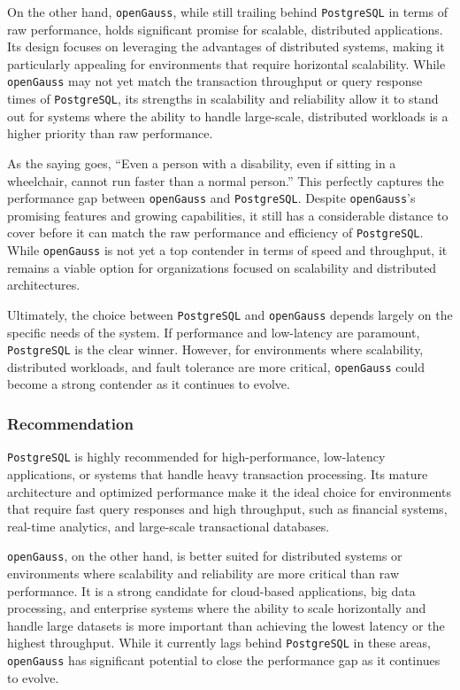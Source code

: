 \documentclass[12pt,a4paper,cs4size]{ctexart}
\begin{document}
On the other hand, \texttt{openGauss}, while still trailing behind \texttt{PostgreSQL} in terms of raw performance, holds significant promise for scalable, distributed applications. Its design focuses on leveraging the advantages of distributed systems, making it particularly appealing for environments that require horizontal scalability. While \texttt{openGauss} may not yet match the transaction throughput or query response times of \texttt{PostgreSQL}, its strengths in scalability and reliability allow it to stand out for systems where the ability to handle large-scale, distributed workloads is a higher priority than raw performance.

As the saying goes, ``Even a person with a disability, even if sitting in a wheelchair, cannot run faster than a normal person.'' \cite{xiong2024} This perfectly captures the performance gap between \texttt{openGauss} and \texttt{PostgreSQL}. Despite \texttt{openGauss}'s promising features and growing capabilities, it still has a considerable distance to cover before it can match the raw performance and efficiency of \texttt{PostgreSQL}. While \texttt{openGauss} is not yet a top contender in terms of speed and throughput, it remains a viable option for organizations focused on scalability and distributed architectures. 

Ultimately, the choice between \texttt{PostgreSQL} and \texttt{openGauss} depends largely on the specific needs of the system. If performance and low-latency are paramount, \texttt{PostgreSQL} is the clear winner. However, for environments where scalability, distributed workloads, and fault tolerance are more critical, \texttt{openGauss} could become a strong contender as it continues to evolve.


\subsubsection*{Recommendation}

\texttt{PostgreSQL} is highly recommended for high-performance, low-latency applications, or systems that handle heavy transaction processing. Its mature architecture and optimized performance make it the ideal choice for environments that require fast query responses and high throughput, such as financial systems, real-time analytics, and large-scale transactional databases.

\texttt{openGauss}, on the other hand, is better suited for distributed systems or environments where scalability and reliability are more critical than raw performance. It is a strong candidate for cloud-based applications, big data processing, and enterprise systems where the ability to scale horizontally and handle large datasets is more important than achieving the lowest latency or the highest throughput. While it currently lags behind \texttt{PostgreSQL} in these areas, \texttt{openGauss} has significant potential to close the performance gap as it continues to evolve.
\end{document}
